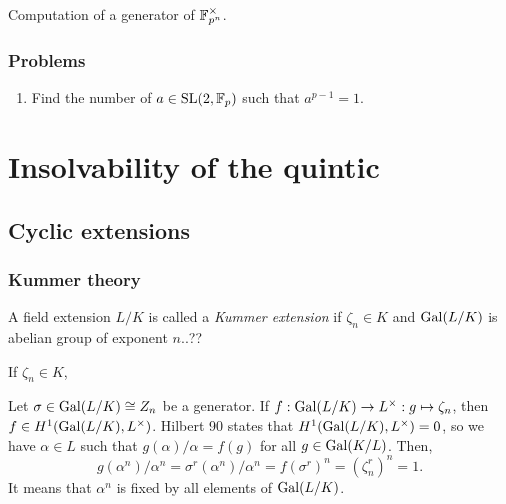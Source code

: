 \documentclass{../../large}
\begin{document}
\begin{prb}
Computation of a generator of $\mathbb{F}_{p^n}^\times$.
\end{prb}

\begin{prb}
\end{prb}

\section*{Problems}

\begin{enumerate}
\item Find the number of $a\in\mathrm{SL}(2,\mathbb{F}_p)$ such that $a^{p-1}=1$.
\end{enumerate}













\part{Insolvability of the quintic}


\chapter{Cyclic extensions}




\section{Kummer theory}


\begin{prb}
A field extension $L/K$ is called a \emph{Kummer extension} if $\zeta_n\in K$ and $\operatorname{Gal}(L/K)$ is abelian group of exponent $n$..??
\begin{parts}
\item If $\zeta_n\in K$, 
\end{parts}
\end{prb}
Let $\sigma\in\operatorname{Gal}(L/K)\cong Z_n$ be a generator.
If $f:\operatorname{Gal}(L/K)\to L^\times:g\mapsto\zeta_n$, then $f\in H^1(\operatorname{Gal}(L/K),L^\times)$.
Hilbert 90 states that $H^1(\operatorname{Gal}(L/K),L^\times)=0$, so we have $\alpha\in L$ such that $g(\alpha)/\alpha=f(g)$ for all $g\in\operatorname{Gal}(K/L)$.
Then,
\[g(\alpha^n)/\alpha^n=\sigma^r(\alpha^n)/\alpha^n=f(\sigma^r)^n=(\zeta_n^r)^n=1.\]
It means that $\alpha^n$ is fixed by all elements of $\operatorname{Gal}(L/K)$.
\end{document}
